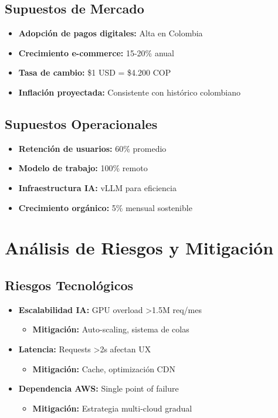 \documentclass[12pt]{article}
\begin{document}
\subsection{Supuestos de Mercado}

\begin{itemize}
    \item \textbf{Adopción de pagos digitales:} Alta en Colombia
    \item \textbf{Crecimiento e-commerce:} 15-20\% anual
    \item \textbf{Tasa de cambio:} \$1 USD = \$4.200 COP
    \item \textbf{Inflación proyectada:} Consistente con histórico colombiano
\end{itemize}

\subsection{Supuestos Operacionales}

\begin{itemize}
    \item \textbf{Retención de usuarios:} 60\% promedio
    \item \textbf{Modelo de trabajo:} 100\% remoto
    \item \textbf{Infraestructura IA:} vLLM para eficiencia
    \item \textbf{Crecimiento orgánico:} 5\% mensual sostenible
\end{itemize}

\section{Análisis de Riesgos y Mitigación}

\subsection{Riesgos Tecnológicos}

\begin{itemize}
    \item \textbf{Escalabilidad IA:} GPU overload >1.5M req/mes
    \begin{itemize}
        \item \textbf{Mitigación:} Auto-scaling, sistema de colas
    \end{itemize}
    
    \item \textbf{Latencia:} Requests >2s afectan UX
    \begin{itemize}
        \item \textbf{Mitigación:} Cache, optimización CDN
    \end{itemize}
    
    \item \textbf{Dependencia AWS:} Single point of failure
    \begin{itemize}
        \item \textbf{Mitigación:} Estrategia multi-cloud gradual
    \end{itemize}
\end{itemize}
\end{document}
